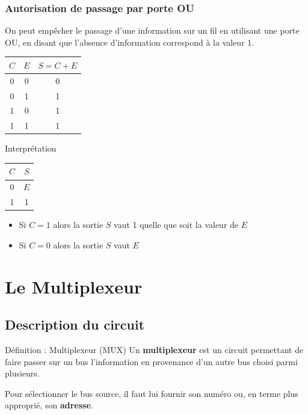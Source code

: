 \documentclass[a4paper,12pt]{article}
\begin{document}
\subsubsection{Autorisation de passage par porte OU}

On peut empêcher le passage d'une information sur un fil en utilisant une porte OU, en disant que l'absence d'information correspond à la valeur 1.

\begin{table}[h]
\centering
\begin{tabular}{|c|c|c|}
\hline
$C$ & $E$ & $S = C + E$ \\
\hline
0 & 0 & 0 \\
0 & 1 & 1 \\
1 & 0 & 1 \\
1 & 1 & 1 \\
\hline
\end{tabular}
\end{table}

\begin{propbox}{Interprétation}
\begin{center}
\begin{tabular}{|c|c|}
\hline
$C$ & $S$ \\
\hline
0 & $E$ \\
1 & 1 \\
\hline
\end{tabular}
\end{center}

\begin{itemize}
    \item Si $C = 1$ alors la sortie $S$ vaut 1 quelle que soit la valeur de $E$
    \item Si $C = 0$ alors la sortie $S$ vaut $E$
\end{itemize}
\end{propbox}

\newpage
\section{Le Multiplexeur}

\subsection{Description du circuit}

\begin{defbox}{Définition : Multiplexeur (MUX)}
Un \textbf{multiplexeur} est un circuit permettant de faire passer sur un bus l'information en provenance d'un autre bus choisi parmi plusieurs.

Pour sélectionner le bus source, il faut lui fournir son numéro ou, en terme plus approprié, son \textbf{adresse}.
\end{defbox}
\end{document}
